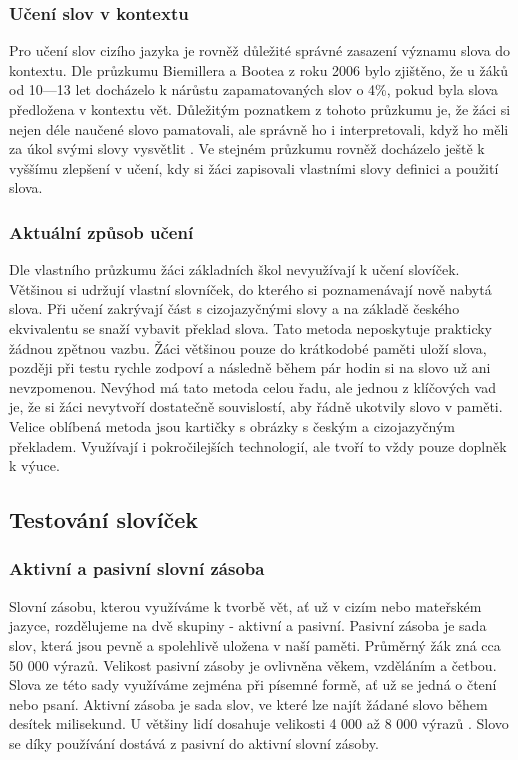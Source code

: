 \documentclass[a4paper,11pt,titlepage,fleqn]{article}
\begin{document}
        \subsubsection{Učení slov v kontextu}
            Pro učení slov cizího jazyka je rovněž důležité správné zasazení významu slova do kontextu. Dle průzkumu Biemillera a Bootea z roku 2006 bylo zjištěno, že u žáků od 10—13 let docházelo k nárůstu zapamatovaných slov o 4\%, pokud byla slova předložena v kontextu vět. Důležitým poznatkem z tohoto průzkumu je, že žáci si nejen déle naučené slovo pamatovali, ale správně ho i interpretovali, když ho měli za úkol svými slovy vysvětlit \cite{bib:beimiller}. Ve stejném průzkumu rovněž docházelo ještě k vyššímu zlepšení v učení, kdy si žáci zapisovali vlastními slovy definici a použití slova.

        \subsubsection{Aktuální způsob učení}
            Dle vlastního průzkumu žáci základních škol nevyužívají k učení slovíček. Většinou si udržují vlastní slovníček, do kterého si poznamenávají nově nabytá slova. Při učení zakrývají část s cizojazyčnými slovy a na základě českého ekvivalentu se snaží vybavit překlad slova. Tato metoda neposkytuje prakticky žádnou zpětnou vazbu. Žáci většinou pouze do krátkodobé paměti uloží slova, později při testu rychle zodpoví a následně během pár hodin si na slovo už ani nevzpomenou. Nevýhod má tato metoda celou řadu, ale jednou z klíčových vad je, že si žáci nevytvoří dostatečně souvislostí, aby řádně ukotvily slovo v paměti. Velice oblíbená metoda jsou kartičky s obrázky s českým a cizojazyčným překladem. Využívají i pokročilejších technologií, ale tvoří to vždy pouze doplněk k výuce.
        
    \subsection{Testování slovíček}

        \subsubsection{Aktivní a pasivní slovní zásoba}
            Slovní zásobu, kterou využíváme k tvorbě vět, ať už v cizím nebo mateřském jazyce, rozdělujeme na dvě skupiny - aktivní a pasivní. Pasivní zásoba je sada slov, která jsou pevně a spolehlivě uložena v naší paměti. Průměrný žák zná cca 50 000 výrazů. Velikost pasivní zásoby je ovlivněna věkem, vzděláním a četbou. Slova ze této sady využíváme zejména při písemné formě, ať už se jedná o čtení nebo psaní. Aktivní zásoba je sada slov, ve které lze najít žádané slovo během desítek milisekund. U většiny lidí dosahuje velikosti 4 000 až 8 000 výrazů \cite{bib:lexikologie}. Slovo se díky používání dostává z pasivní do aktivní slovní zásoby. 
\end{document}

